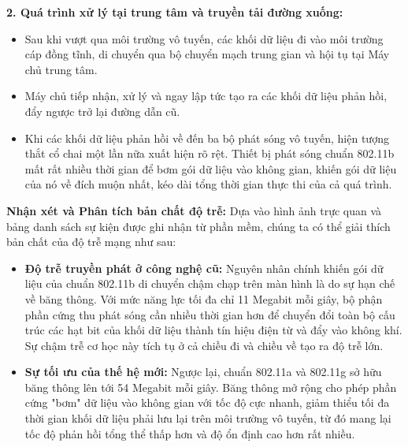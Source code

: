 \documentclass[a4paper, 12pt]{article}
\begin{document}
\textbf{2. Quá trình xử lý tại trung tâm và truyền tải đường xuống:}
\begin{itemize}
    \item Sau khi vượt qua môi trường vô tuyến, các khối dữ liệu đi vào môi trường cáp đồng tĩnh, di chuyển qua bộ chuyển mạch trung gian và hội tụ tại Máy chủ trung tâm.
    \item Máy chủ tiếp nhận, xử lý và ngay lập tức tạo ra các khối dữ liệu phản hồi, đẩy ngược trở lại đường dẫn cũ.
    \item Khi các khối dữ liệu phản hồi về đến ba bộ phát sóng vô tuyến, hiện tượng thắt cổ chai một lần nữa xuất hiện rõ rệt. Thiết bị phát sóng chuẩn 802.11b mất rất nhiều thời gian để bơm gói dữ liệu vào không gian, khiến gói dữ liệu của nó về đích muộn nhất, kéo dài tổng thời gian thực thi của cả quá trình.
\end{itemize}

\textbf{Nhận xét và Phân tích bản chất độ trễ:}
Dựa vào hình ảnh trực quan và bảng danh sách sự kiện được ghi nhận từ phần mềm, chúng ta có thể giải thích bản chất của độ trễ mạng như sau:
\begin{itemize}
    \item \textbf{Độ trễ truyền phát ở công nghệ cũ:} Nguyên nhân chính khiến gói dữ liệu của chuẩn 802.11b di chuyển chậm chạp trên màn hình là do sự hạn chế về băng thông. Với mức năng lực tối đa chỉ 11 Megabit mỗi giây, bộ phận phần cứng thu phát sóng cần nhiều thời gian hơn để chuyển đổi toàn bộ cấu trúc các hạt bit của khối dữ liệu thành tín hiệu điện từ và đẩy vào không khí. Sự chậm trễ cơ học này tích tụ ở cả chiều đi và chiều về tạo ra độ trễ lớn.
    \item \textbf{Sự tối ưu của thế hệ mới:} Ngược lại, chuẩn 802.11a và 802.11g sở hữu băng thông lên tới 54 Megabit mỗi giây. Băng thông mở rộng cho phép phần cứng "bơm" dữ liệu vào không gian với tốc độ cực nhanh, giảm thiểu tối đa thời gian khối dữ liệu phải lưu lại trên môi trường vô tuyến, từ đó mang lại tốc độ phản hồi tổng thể thấp hơn và độ ổn định cao hơn rất nhiều.
\end{itemize}
\end{document}
